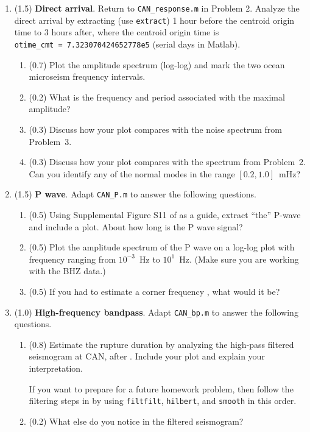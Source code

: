 \documentclass[11pt,titlepage,fleqn]{article}
\begin{document}
\begin{enumerate}
\item (1.5) {\bf Direct arrival}. 
Return to \verb+CAN_response.m+ in Problem 2.
Analyze the direct arrival by extracting (use \verb+extract+) 1 hour before the centroid origin time to 3 hours after, where the centroid origin time is \\ \verb+otime_cmt = 7.323070424652778e5+ (serial days in Matlab).

\begin{enumerate}
\item (0.7) Plot the amplitude spectrum (log-log) and mark the two ocean microseism frequency intervals.
\item (0.2) What is the frequency and period associated with the maximal amplitude?
\item (0.3) Discuss how your plot compares with the noise spectrum from Problem~3.
\item (0.3) Discuss how your plot compares with the spectrum from Problem~2. \\
Can you identify any of the normal modes in the range $[0.2,1.0]$~mHz?
\end{enumerate}


\item (1.5) {\bf P wave}. Adapt \verb+CAN_P.m+ to answer the following questions.
%
\begin{enumerate}
\item (0.5) Using Supplemental Figure S11 of \citet{Ammon2005} as a guide, extract ``the'' P-wave and include a plot. About how long is the P wave signal?
\item (0.5) Plot the amplitude spectrum of the P wave on a log-log plot with frequency ranging from $10^{-3}$~Hz to $10^1$~Hz. (Make sure you are working with the BHZ data.)

\item (0.5) If you had to estimate a corner frequency \citep[][p.~267]{SteinWysession}, what would it be?
\end{enumerate}


\item (1.0) {\bf High-frequency bandpass}. Adapt \verb+CAN_bp.m+ to answer the following questions.
%
\begin{enumerate}
\item (0.8) Estimate the rupture duration by analyzing the high-pass filtered seismogram at CAN, after \citet{Ni2005}. Include your plot and explain your interpretation.

If you want to prepare for a future homework problem, then follow the filtering steps in \citet{Ni2005} by using \verb+filtfilt+, \verb+hilbert+, and \verb+smooth+ in this order.

\item (0.2) What else do you notice in the filtered seismogram?
\end{enumerate}

\end{enumerate}
\end{document}
